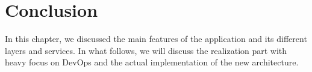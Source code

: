 \setcounter{secnumdepth}{0} %
\section{Conclusion}
In this chapter, we discussed the main features of the application and its different layers and services.
In what follows, we will discuss the realization part with heavy focus on DevOps and the actual implementation of the new architecture.
